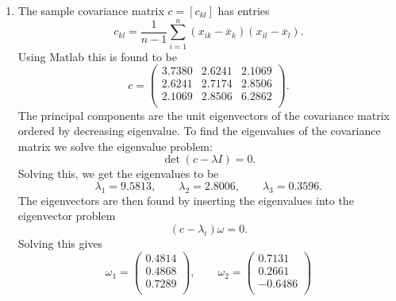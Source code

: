 \begin{derivation}
\begin{enumerate}[label=\alph*)]
      \item The sample covariance matrix $c = [c_{kl}]$ has entries
        \begin{equation*}
          c_{kl} = \frac{1}{n-1} \sum_{i = 1}^{n} \left( x_{ik} - \overline{x}_k \right) \left( x_{il} - \overline{x}_l \right)
        .\end{equation*}
        Using Matlab this is found to be
        \begin{equation*}
          c = \begin{pmatrix}
            \num{3,7380}  & \num{2,6241}  & \num{2,1069} \\
          \num{2,6241}  & \num{2,7174}  & \num{2,8506} \\
          \num{2,1069}  & \num{2,8506}  & \num{6,2862} \\
          \end{pmatrix}
        .\end{equation*}
        The principal components are the unit eigenvectors of the covariance matrix ordered by decreasing eigenvalue.
        To find the eigenvalues of the covariance matrix we solve the eigenvalue problem:
        \begin{equation*}
          \det(c - \lambda I) = 0
        .\end{equation*}
        Solving this, we get the eigenvalues to be
        \begin{equation*}
          \lambda_1 = \num{9,5813}, \qquad \lambda_2 = \num{2,8006}, \qquad \lambda_3 = \num{0,3596}
        .\end{equation*}
        The eigenvectors are then found by inserting the eigenvalues into the eigenvector problem
        \begin{equation*}
          \left( c - \lambda_i \right)\omega = 0
        .\end{equation*}
        Solving this gives
        \begin{equation*}
          \omega_1 = \begin{pmatrix}
            \num{0,4814} \\
          \num{0,4868} \\
          \num{0,7289} \\
          \end{pmatrix}, \qquad \omega_2 = \begin{pmatrix}
            \num{0,7131} \\
          \num{0,2661} \\
          \num{-0,6486} \\

\end{pmatrix}
\end{equation*}
\end{enumerate}
\end{derivation}
